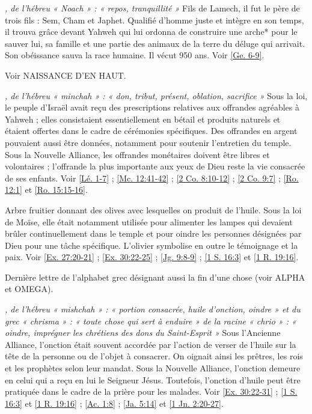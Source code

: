 \begin{multicols}{2}
\textit{, de l'hébreu « Noach » : « repos, tranquillité »}\newline
Fils de Lamech, il fut le père de trois fils : Sem, Cham et Japhet. Qualifié d'homme juste et intègre en son temps, il trouva grâce devant Yahweh qui lui ordonna de construire une arche* pour le sauver lui, sa famille et une partie des animaux de la terre du déluge qui arrivait. Son obéissance sauva la race humaine. Il vécut 950 ans. Voir \vref{Ge. 6-9}.

\textit{}\newline
Voir NAISSANCE D'EN HAUT.

\textit{, de l'hébreu « minchah » : « don, tribut, présent, oblation, sacrifice »}\newline
Sous la loi, le peuple d'Israël avait reçu des prescriptions relatives aux offrandes agréables à Yahweh ; elles consistaient essentiellement en bétail et produits naturels et étaient offertes dans le cadre de cérémonies spécifiques. Des offrandes en argent pouvaient aussi être données, notamment pour soutenir l'entretien du temple. Sous la Nouvelle Alliance, les offrandes monétaires doivent être libres et volontaires ; l'offrande la plus importante aux yeux de Dieu reste la vie consacrée de ses enfants. Voir \vref{Lé. 1-7} ; \vref{Mc. 12:41-42} ; \vref{2 Co. 8:10-12} ; \vref{2 Co. 9:7} ; \vref{Ro. 12:1} et \vref{Ro. 15:15-16}.

\textit{}\newline
Arbre fruitier donnant des olives avec lesquelles on produit de l'huile. Sous la loi de Moïse, elle était notamment utilisée pour alimenter les lampes qui devaient brûler continuellement dans le temple et pour oindre les personnes désignées par Dieu pour une tâche spécifique. L'olivier symbolise en outre le témoignage et la paix. Voir \vref{Ex. 27:20-21} ; \vref{Ex. 30:22-25} ; \vref{Jg. 9:8-9} ; \vref{1 S. 16:3} et \vref{1 R. 19:16}.

\textit{}\newline
Dernière lettre de l'alphabet grec désignant aussi la fin d'une chose (voir ALPHA et OMEGA).

\textit{, de l'hébreu « mishchah » : « portion consacrée, huile d'onction, oindre » et du grec « chrisma » : « toute chose qui sert à enduire » de la racine « chrio » : « oindre, imprégner les chrétiens des dons du Saint-Esprit »}\newline
Sous l'Ancienne Alliance, l'onction était souvent accordée par l'action de verser de l'huile sur la tête de la personne ou de l'objet à consacrer. On oignait ainsi les prêtres, les rois et les prophètes selon leur mandat. Sous la Nouvelle Alliance, l'onction demeure en celui qui a reçu en lui le Seigneur Jésus. Toutefois, l'onction d'huile peut être pratiquée dans le cadre de la prière pour les malades. Voir \vref{Ex. 30:22-31} ; \vref{1 S. 16:3} et \vref{1 R. 19:16} ; \vref{Ac. 1:8} ; \vref{Ja. 5:14} et \vref{1 Jn. 2:20-27}.


\end{multicols}
